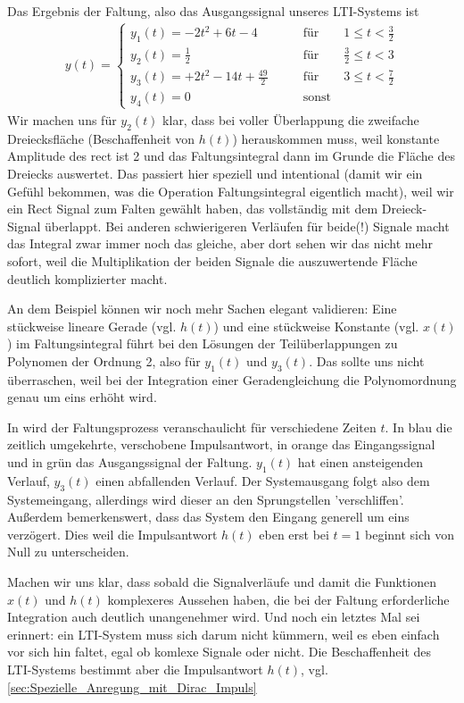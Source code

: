 \begin{Loesung}
Das Ergebnis der Faltung, also das Ausgangssignal unseres LTI-Systems ist
\begin{align}
y(t) =
\begin{cases}
  y_1(t) = -2 t^2 + 6 t - 4 &\qquad \mathrm{für} \qquad 1 \leq t < \frac{3}{2}\\
  y_2(t) = \frac{1}{2}  &\qquad \mathrm{für} \qquad \frac{3}{2} \leq t < 3\\
  y_3(t) = +2 t^2 - 14 t + \frac{49}{2} &\qquad \mathrm{für} \qquad 3 \leq t < \frac{7}{2}\\
  y_4(t)=0 &\qquad \mathrm{sonst}
\end{cases}
\end{align}
%
Wir machen uns für $y_2(t)$ klar, dass bei voller Überlappung die
zweifache Dreiecksfläche
(Beschaffenheit von $h(t)$) herauskommen muss, weil konstante Amplitude des rect ist 2 und
das Faltungsintegral dann im Grunde die Fläche des Dreiecks auswertet.
%
Das passiert hier speziell und intentional (damit wir ein Gefühl bekommen, was
die Operation Faltungsintegral eigentlich macht),
weil wir ein Rect Signal zum Falten gewählt haben,
das vollständig mit dem Dreieck-Signal überlappt.
%
Bei anderen schwierigeren Verläufen für beide(!) Signale macht das Integral zwar immer noch
das gleiche, aber dort sehen wir das nicht mehr sofort, weil die Multiplikation der beiden Signale die auszuwertende Fläche deutlich komplizierter macht.

An dem Beispiel können wir noch mehr Sachen elegant validieren:
Eine stückweise lineare Gerade (vgl. $h(t)$) und eine stückweise Konstante (vgl. $x(t)$)
im Faltungsintegral führt
bei den Lösungen der Teilüberlappungen zu Polynomen der Ordnung 2, also für
$y_1(t)$ und $y_3(t)$. Das sollte uns nicht überraschen,
weil bei der Integration einer Geradengleichung die Polynomordnung genau um eins
erhöht wird.
%

In  wird der Faltungsprozess veranschaulicht für verschiedene
Zeiten $t$. In blau die zeitlich umgekehrte, verschobene Impulsantwort, in
orange das Eingangssignal und in grün das Ausgangssignal der Faltung.
%
$y_1(t)$ hat einen ansteigenden Verlauf, $y_3(t)$ einen abfallenden Verlauf.
Der Systemausgang folgt also dem Systemeingang, allerdings wird dieser an den
Sprungstellen 'verschliffen'.
%
Außerdem bemerkenswert, dass das System den Eingang generell um eins verzögert.
Dies weil die Impulsantwort $h(t)$ eben erst bei $t=1$ beginnt sich von Null
zu unterscheiden.
%

Machen wir uns klar, dass sobald die Signalverläufe und damit die Funktionen
$x(t)$ und $h(t)$ komplexeres Aussehen haben, die bei der Faltung erforderliche
Integration auch deutlich unangenehmer wird. Und noch ein letztes Mal sei erinnert: ein LTI-System muss sich darum nicht kümmern, weil es eben einfach vor sich hin faltet, egal ob komlexe Signale oder nicht. Die Beschaffenheit des LTI-Systems bestimmt aber die Impulsantwort $h(t)$, vgl. \ref{sec:Spezielle_Anregung_mit_Dirac_Impuls}

\end{Loesung}



